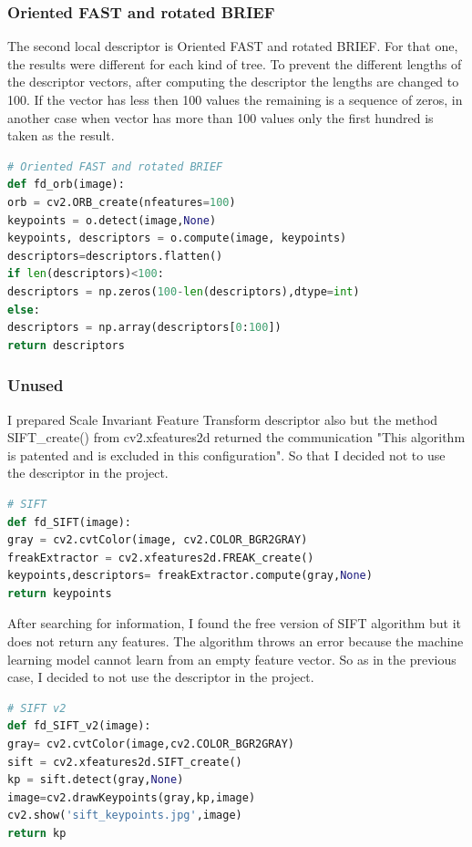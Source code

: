 \documentclass[12pt]{article}
\begin{document}
\subsubsection{Oriented FAST and rotated BRIEF}

The second local descriptor is Oriented FAST and rotated BRIEF. For that one, the results were different for each kind of tree. To prevent the different lengths of the descriptor vectors, after computing the descriptor the lengths are changed to 100. If the vector has less then 100 values the remaining is a sequence of zeros, in another case when vector has more than 100 values only the first hundred is taken as the result.

\begin{lstlisting}[language=Python]
# Oriented FAST and rotated BRIEF
def fd_orb(image):
orb = cv2.ORB_create(nfeatures=100)
keypoints = o.detect(image,None)
keypoints, descriptors = o.compute(image, keypoints)
descriptors=descriptors.flatten()
if len(descriptors)<100:
descriptors = np.zeros(100-len(descriptors),dtype=int)
else:
descriptors = np.array(descriptors[0:100])
return descriptors
\end{lstlisting}

\subsubsection{Unused}

I prepared Scale Invariant Feature Transform descriptor also but the method SIFT\_create() from cv2.xfeatures2d returned the communication "This algorithm is patented and is excluded in this configuration". So that I decided not to use the descriptor in the project.

\begin{lstlisting}[language=Python]
# SIFT
def fd_SIFT(image):
gray = cv2.cvtColor(image, cv2.COLOR_BGR2GRAY)
freakExtractor = cv2.xfeatures2d.FREAK_create()
keypoints,descriptors= freakExtractor.compute(gray,None)
return keypoints
\end{lstlisting}

After searching for information, I found the free version of SIFT algorithm but it does not return any features. The algorithm throws an error because the machine learning model cannot learn from an empty feature vector. So as in the previous case, I decided to not use the descriptor in the project.

\begin{lstlisting}[language=Python]
# SIFT v2
def fd_SIFT_v2(image):
gray= cv2.cvtColor(image,cv2.COLOR_BGR2GRAY)
sift = cv2.xfeatures2d.SIFT_create()
kp = sift.detect(gray,None)
image=cv2.drawKeypoints(gray,kp,image)
cv2.show('sift_keypoints.jpg',image)
return kp
\end{lstlisting}
\end{document}
